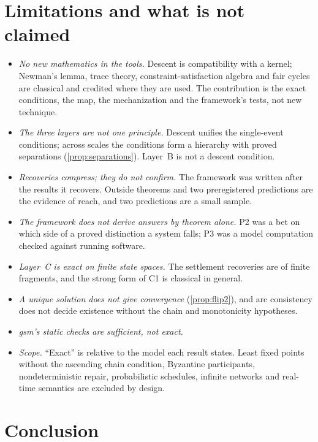 
\section{Limitations and what is not claimed}\label{sec:limits}

\begin{itemize}[nosep]
  \item \emph{No new mathematics in the tools.} Descent is compatibility with a kernel; Newman's lemma,
    trace theory, constraint-satisfaction algebra and fair cycles are classical and credited where they
    are used. The contribution is the exact conditions, the map, the mechanization and the framework's
    tests, not new technique.
  \item \emph{The three layers are not one principle.} Descent unifies the single-event conditions;
    across scales the conditions form a hierarchy with proved separations (\cref{prop:separations}).
    Layer~B is not a descent condition.
  \item \emph{Recoveries compress; they do not confirm.} The framework was written after the results it
    recovers. Outside theorems and two preregistered predictions are the evidence of reach, and two
    predictions are a small sample.
  \item \emph{The framework does not derive answers by theorem alone.} P2 was a bet on which side of a
    proved distinction a system falls; P3 was a model computation checked against running software.
  \item \emph{Layer~C is exact on finite state spaces.} The settlement recoveries are of finite
    fragments, and the strong form of C1 is classical in general.
  \item \emph{A unique solution does not give convergence} (\cref{prop:flip2}), and arc consistency
    does not decide existence without the chain and monotonicity hypotheses.
  \item \emph{gsm's static checks are sufficient, not exact.}
  \item \emph{Scope.} ``Exact'' is relative to the model each result states. Least fixed points without the
    ascending chain condition, Byzantine participants,
    nondeterministic repair, probabilistic schedules, infinite networks and real-time semantics are
    excluded by design.
\end{itemize}

\section{Conclusion}\label{sec:conclusion}

